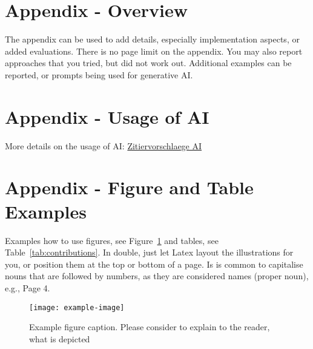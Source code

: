 \documentclass[12pt,a4paper,twocolumn]{article}
\begin{document}
\appendix

\section{Appendix - Overview}

The appendix can be used to add details, especially implementation aspects, or added evaluations.
There is no page limit on the appendix.
You may also report approaches that you tried, but did not work out.
Additional examples can be reported, or prompts being used for generative AI.

\section{Appendix - Usage of AI}
More details on the usage of AI: \href{https://www.tugraz.at/fileadmin/Studierende\_und\_Bedienstete/Information/Unsere\_TU\_Graz/Lehre\_an\_der\_TU\_Graz/Zitiervorschlaege_KI.pdf}{Zitiervorschlaege AI}

\section{Appendix - Figure and Table Examples}
Examples how to use figures, see Figure~\ref{fig:example} and tables, see Table~\ref{tab:contributions}.
In double, just let Latex layout the illustrations for you, or position them at the top or bottom of a page.
Is is common to capitalise nouns that are followed by numbers, as they are considered names (proper noun), e.g., Page 4.

\begin{figure}
    \centering
        \texttt{[image: example-image]}
    \caption{Example figure caption. Please consider to explain to the reader, what is depicted}
    \label{fig:example}
\end{figure}
\end{document}
